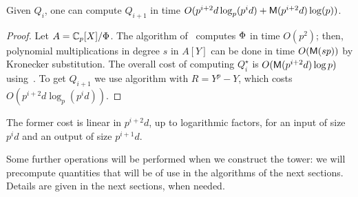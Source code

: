 \begin{theorem}
  Given $Q_i$, one can compute $Q_{i+1}$ in time
  $O( p^{i+2}d\log_p(p^id)+\mathrm{\sf M}(p^{i+2}d)\log(p))$.
\end{theorem}
\begin{proof} Let $A=\mathbb{C}_p[X]/\Phi$. The algorithm
of~\cite{Brent93} computes $\Phi$ in time $O(p^2)$; then, polynomial
multiplications in degree $s$ in $A[Y]$ can be done in time
$O(\mathrm{\sf M}(sp))$ by Kronecker substitution. The overall cost of
computing $Q_i^\star$ is $O(\mathrm{\sf M}(p^{i+2}d)\log p)$
using~\cite[Algo.~10.3]{vzGG}. To get $Q_{i+1}$ we use algorithm
 with $R=Y^p-Y$, which costs $O(p^{i+2}d\log_p(p^id))$.
\end{proof}

\smallskip

The former cost is linear in $p^{i+2}d$, up to logarithmic factors,
for an input of size $p^id$ and an output of size $p^{i+1}d$.

Some further operations will be performed when we construct the tower:
we will precompute quantities that will be of use in the algorithms of
the next sections. Details are given in the next sections, when
needed.


%
